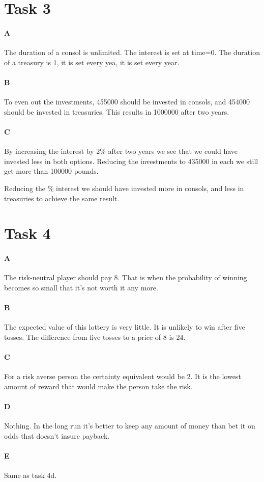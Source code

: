 \documentclass[12pt, a4paper]{article}
\begin{document}
\section{Task 3}
\paragraph{A}
The duration of a consol is unlimited. The interest is set at time=0. The
duration of a treasury is 1, it is set every yea, it is set every year.

\paragraph{B}
To even out the investments, 455000 should be invested in consols, and 454000
should be invested in treasuries. This results in 1000000 after two years. 

\paragraph{C}
By increasing the interest by 2\% after two years we see that we could have
invested less in both  options. Reducing the investments to 435000 in each we
still get more than 100000 pounds.

Reducing the \% interest we should have invested more in consols, and less in
treasuries to achieve the same result. 

\section{Task 4}
\paragraph{A}
The risk-neutral player should pay 8. That is when the probability of winning
becomes so small that it's not worth it any more.

\paragraph{B}
The expected value of this lottery is very little. It is unlikely to win after
five tosses. The difference from five tosses to a price of 8 is 24.  

\paragraph{C}
For a risk averse person the certainty equivalent would be 2. It is the lowest
amount of reward that would make the person take the risk. 

\paragraph{D}
Nothing. In the long run it's better to keep any amount of money than bet it on
odds that doesn't insure payback. 

\paragraph{E}
Same as task 4d.
\end{document}
